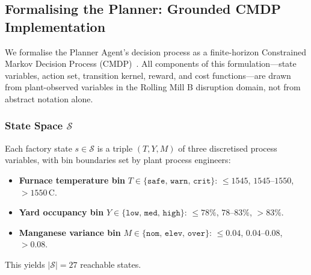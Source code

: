 \documentclass[conference]{IEEEtran}
\begin{document}
\begin{table}[!t]
\sffamily
\caption{Phased Deployment Maturity Framework}\label{tab:maturity}
\centering
\small
{}
\end{table}

\subsection{Formalising the Planner: Grounded CMDP Implementation}\label{sec:cmdp}

We formalise the Planner Agent's decision process as a finite-horizon Constrained Markov Decision Process (CMDP)~\cite{achiam2017,yang2023}. All components of this formulation---state variables, action set, transition kernel, reward, and cost functions---are drawn from plant-observed variables in the Rolling Mill B disruption domain, not from abstract notation alone.

\subsubsection{State Space \texorpdfstring{$\mathcal{S}$}{S}}
Each factory state $s \in \mathcal{S}$ is a triple $(T, Y, M)$ of three discretised process variables, with bin boundaries set by plant process engineers:
\begin{itemize}
  \item \textbf{Furnace temperature bin} $T \in \{\texttt{safe},\allowbreak\,\texttt{warn},\allowbreak\,\texttt{crit}\}$: ${\leq}1545$, $1545$--$1550$, ${>}1550$\,\textdegree C.
  \item \textbf{Yard occupancy bin} $Y \in \{\texttt{low},\allowbreak\,\texttt{med},\allowbreak\,\texttt{high}\}$: ${\leq}78\%$, $78$--$83\%$, ${>}83\%$.
  \item \textbf{Manganese variance bin} $M \in \{\texttt{nom},\allowbreak\,\texttt{elev},\allowbreak\,\texttt{over}\}$: ${\leq}0.04$, $0.04$--$0.08$, ${>}0.08$.
\end{itemize}
This yields $|\mathcal{S}|=27$ reachable states.
\end{document}
